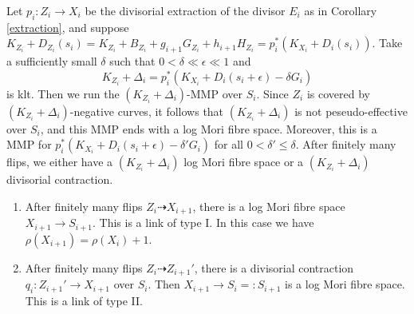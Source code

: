 \documentclass[11pt]{amsart}
\begin{document}
\begin{enumerate}
    Let $p_{i}:Z_{i}\to X_{i}$ be the divisorial extraction of the divisor $E_{i}$ as in Corollary \ref{extraction}, and suppose $K_{Z_{i}}+D_{Z_{i}}(s_{i})=K_{Z_{i}}+B_{Z_{i}}+g_{i+1}G_{Z_{i}}+h_{i+1}H_{Z_{i}}=p_{i}^*\left(K_{X_{i}}+D_{i}\left(s_{i}\right)\right)$.
   Take a sufficiently small $\delta$ such that $0<\delta \ll \epsilon \ll 1$ and
   \[
     K_{Z_{i}}+\Delta_{i}=p_{i}^*(K_{X_{i}}+D_{i}(s_{i}+\epsilon)-\delta G_{i})
   \]
  is klt. Then we run the $(K_{Z_{i}}+\Delta_{i})$-MMP  over $S_{i}$. Since $Z_{i}$ is covered by $(K_{Z_{i}}+\Delta_{i})$-negative curves, it follows that $(K_{Z_{i}}+\Delta_{i})$ is not peseudo-effective over $S_{i}$, and  this MMP ends with a log Mori fibre space. Moreover, this is a MMP for $p_{i}^*(K_{X_{i}}+D_{i}(s_{i}+\epsilon)-\delta'G_{i})$ for all $0<\delta'\leqslant\delta$. After finitely many flips, we either have a $(K_{Z_{i}}+\Delta_{i})$ log Mori fibre space or a $(K_{Z_{i}}+\Delta_{i})$ divisorial contraction.
  \begin{enumerate}
    \item\label{2b1} After finitely many flips $Z_{i}\dashrightarrow X_{i+1}$, there is a log Mori fibre space $X_{i+1}\to S_{i+1}$. This is a link of type I. In this case we have $\rho(X_{i+1})=\rho(X_{i})+1$.
    \item\label{2b2} After finitely many flips $Z_{i}\dashrightarrow Z_{i+1}'$, there is a divisorial contraction $q_{i}:Z_{i+1}'\to X_{i+1}$ over $S_i$. Then $X_{i+1}\to S_{i}=:S_{i+1}$ is a log Mori fibre space. This is a link of type II.
  \end{enumerate}
\end{enumerate}
\end{document}
